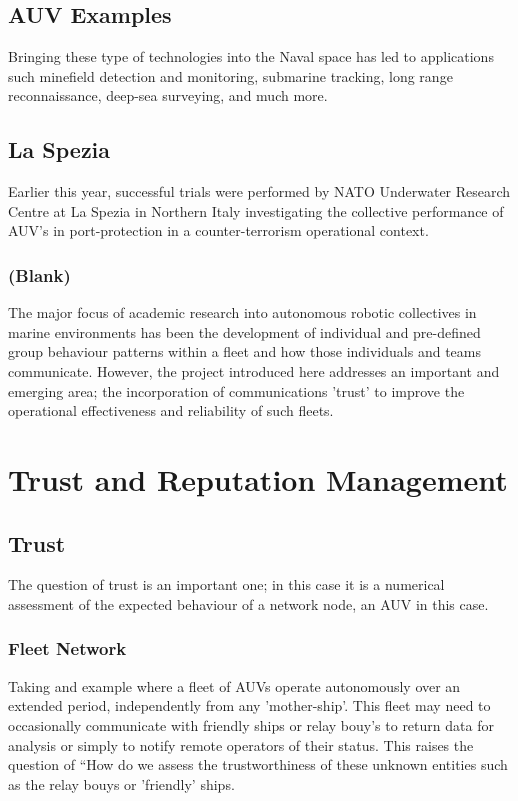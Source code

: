 \documentclass[oneside,11pt,a4paper]{Latex/Classes/PhDthesisPSnPDF}
\begin{document}
\begin{doublespace}
\subsection{AUV Examples}  Bringing these type of technologies into the Naval
space has led to applications such minefield detection and monitoring, submarine tracking,
long range reconnaissance, deep-sea surveying, and much more. 

\subsection{La Spezia} Earlier this year,
successful trials were performed by NATO Underwater Research Centre at La Spezia
in Northern Italy investigating the collective performance of AUV's in port-protection in a
counter-terrorism operational context.

\subsubsection{(Blank)} The major focus of academic research into autonomous
robotic collectives in marine environments has been the development of
individual and pre-defined group behaviour patterns within a fleet and how
those individuals and teams communicate. However, the project introduced here
addresses an important and emerging area; the incorporation of communications
'trust' to improve the operational effectiveness and reliability of such fleets.

\section{Trust and Reputation Management}
\subsection{Trust}  The question of trust is an important one; in this case it 
is a numerical assessment of the expected behaviour of a network node, an AUV 
in this case.

\subsubsection{Fleet Network}  Taking and example where a fleet of AUVs operate 
autonomously over an extended period, independently from any 'mother-ship'.
This fleet may need to occasionally communicate with friendly ships or relay 
bouy's to return data for analysis or simply to notify remote operators of
their status.  This raises the question of ``How do we assess the 
trustworthiness of these unknown entities such as the relay bouys or 'friendly' 
ships.


\end{doublespace}
\end{document}
